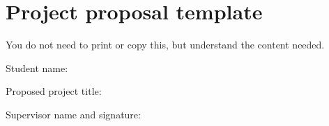 \chapter{Project proposal template}

\begin{tcolorbox}
    You do not need to print or copy this, but understand the content needed.
\end{tcolorbox}

Student name: \TextField[width=9.6cm,name=Name]{}

Proposed project title: \TextField[width=8.5cm,name=Title]{}




Supervisor name and signature: \TextField[width=7cm,name=SuperNameAndSig]{}